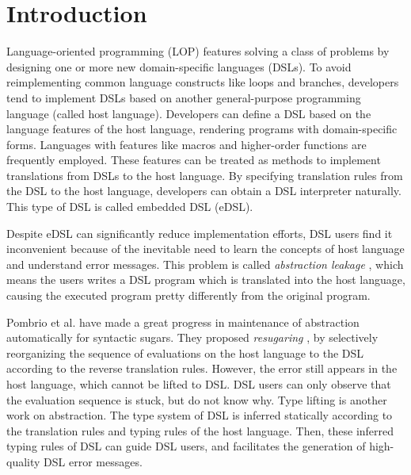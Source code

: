 \section{Introduction}

Language-oriented programming (LOP) \cite{LOP} features solving a class of problems by designing one or more new domain-specific languages (DSLs).
To avoid reimplementing common language constructs like loops and branches,
developers tend to implement DSLs based on another general-purpose programming language (called host language).
Developers can define a DSL based on the language features of the host language, rendering programs with domain-specific forms.
Languages with features like macros and higher-order functions are frequently employed\cite{macro-dsl,macro-dsl-2}.
These features can be treated as methods to implement translations from DSLs to the host language.
By specifying translation rules from the DSL to the host language, developers can obtain a DSL interpreter naturally.
This type of DSL is called embedded DSL (eDSL).

Despite eDSL can significantly reduce implementation efforts, DSL users find it inconvenient because of the inevitable need to learn the concepts of host language and understand error messages.
This problem is called \textit{abstraction leakage} \cite{Abstraction},
 which means the users writes a DSL program which is translated into the host language,
 causing the executed program pretty differently from the original program.

Pombrio et al. have made a great progress in maintenance of abstraction automatically for syntactic sugars.
They proposed \textit{resugaring} \cite{resugar}, by selectively reorganizing the sequence of evaluations on the host language to the DSL according to the reverse translation rules.
However, the error still appears in the host language, which cannot be lifted to DSL.
DSL users can only observe that the evaluation sequence is stuck, but do not know why. 
Type lifting \cite{infer-types} is another work on abstraction.
The type system of DSL is inferred statically according to the translation rules and typing rules of the host language.
Then, these inferred typing rules of DSL can guide DSL users,
 and facilitates the generation of high-quality DSL error messages.


